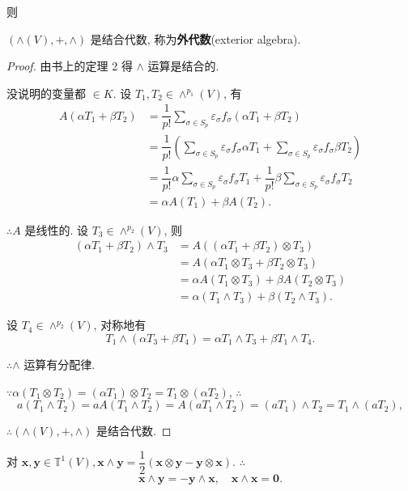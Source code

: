 \documentclass{ctexart}
\begin{document}
则
\begin{theorem}
    $(\land(V),+,\land)$ 是结合代数, 称为\textbf{外代数}(exterior algebra).
\end{theorem}
\begin{proof}
    由书上的定理 2 得 $\land$ 运算是结合的.

    没说明的变量都 $\in K$. 设 $T_1,T_2\in\land^{p_1}(V)$, 有
    \begin{align*}
        A(\alpha T_1+\beta T_2) & =\dfrac{1}{p!}\sum\limits_{\sigma\in S_p}\varepsilon_\sigma f_\sigma(\alpha T_1+\beta T_2) \\
        & =\dfrac{1}{p!}\left(\sum\limits_{\sigma\in S_p}\varepsilon_\sigma f_\sigma\alpha T_1+\sum\limits_{\sigma\in S_p}\varepsilon_\sigma f_\sigma\beta T_2\right) \\
        & =\dfrac{1}{p!}\alpha\sum\limits_{\sigma\in S_p}\varepsilon_\sigma f_\sigma T_1+\dfrac{1}{p!}\beta\sum\limits_{\sigma\in S_p}\varepsilon_\sigma f_\sigma T_2 \\
        & =\alpha A(T_1)+\beta A(T_2).
    \end{align*}

    $\therefore A$ 是线性的. 设 $T_3\in\land^{p_2}(V)$, 则
    \begin{align*}
        (\alpha T_1+\beta T_2)\land T_3 & =A((\alpha T_1+\beta T_2)\otimes T_3) \\
        & =A(\alpha T_1\otimes T_3+\beta T_2\otimes T_3) \\
        & =\alpha A(T_1\otimes T_3)+\beta A(T_2\otimes T_3) \\
        & =\alpha (T_1\land T_3)+\beta (T_2\land T_3).
    \end{align*}

    设 $T_4\in\land^{p_2}(V)$, 对称地有
    \[T_1\land(\alpha T_3+\beta T_4)=\alpha T_1\land T_3+\beta T_1\land T_4.\]
    
    $\therefore\land$ 运算有分配律.

    $\because\alpha(T_1\otimes T_2)=(\alpha T_1)\otimes T_2=T_1\otimes(\alpha T_2)$, $\therefore$
    \[a(T_1\land T_2)=aA(T_1\land T_2)=A(aT_1\land T_2)=(aT_1)\land T_2=T_1\land(aT_2),\]

    $\therefore(\land(V),+,\land)$ 是结合代数.
\end{proof}
\begin{example}\label{exa4.1}
    对 $\boldsymbol{x},\boldsymbol{y}\in\mathbb{T}^1(V),\boldsymbol{x}\land\boldsymbol{y}=\dfrac{1}{2}(\boldsymbol{x}\otimes\boldsymbol{y}-\boldsymbol{y}\otimes\boldsymbol{x})$. $\therefore$
    \[\boldsymbol{x}\land\boldsymbol{y}=-\boldsymbol{y}\land\boldsymbol{x},\quad\boldsymbol{x}\land\boldsymbol{x}=\boldsymbol{0}.\]
\end{example}
\end{document}
